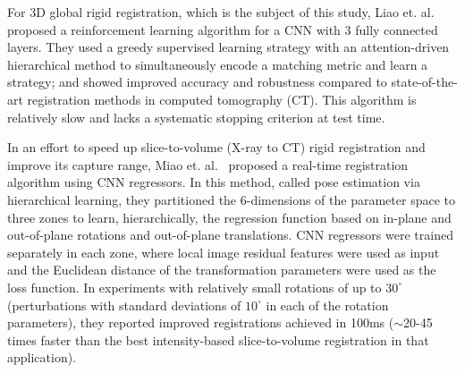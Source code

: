 \documentclass[journal,transmag]{IEEEtran}
\begin{document}
For 3D global rigid registration, which is the subject of this study, Liao et. al.~\cite{liao2017artificial} proposed a reinforcement learning algorithm for a CNN with 3 fully connected layers. They used a greedy supervised learning strategy with an attention-driven hierarchical method to simultaneously encode a matching metric and learn a strategy; and showed improved accuracy and robustness compared to state-of-the-art registration methods in computed tomography (CT). This algorithm is relatively slow and lacks a systematic stopping criterion at test time.

In an effort to speed up slice-to-volume (X-ray to CT) rigid registration and improve its capture range, Miao et. al.~\cite{miao2016real, miao2016cnn} proposed a real-time registration algorithm using CNN regressors. In this method, called pose estimation via hierarchical learning, they partitioned the 6-dimensions of the parameter space to three zones to learn, hierarchically, the regression function based on in-plane and out-of-plane rotations and out-of-plane translations. CNN regressors were trained separately in each zone, where local image residual features were used as input and the Euclidean distance of the transformation parameters were used as the loss function. In experiments with relatively small rotations of up to $30^{\circ}$ (perturbations with standard deviations of $10^{\circ}$ in each of the rotation parameters), they reported improved registrations achieved in 100ms ($\sim$20-45 times faster than the best intensity-based slice-to-volume registration in that application).
\end{document}

